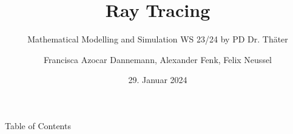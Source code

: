 \documentclass[en]{sdqbeamer}
\title[Ray Tracing]{Ray Tracing}
\subtitle{Mathematical Modelling and Simulation WS 23/24 by PD Dr. Thäter}
\author[Mathematical Modelling and Simulation]{Francisca Azocar Dannemann, Alexander Fenk, Felix Neussel}
\date[29.\,1.\,2024]{29. Januar 2024}
\begin{document}
 
\KITtitleframe

\begin{frame}{Table of Contents}
\tableofcontents
\end{frame}










\begin{frame}

\printbibliography
\end{frame}







\end{document}
